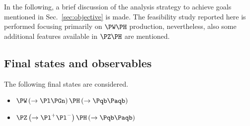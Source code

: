 \documentclass[a4paper,11pt]{article}
\newcommand{\Pb}{{{\Pqb}}\xspace}
\newcommand{\PAb}{{{{\Paqb}}}\xspace}
\begin{document}
In the following, a brief discussion of the analysis strategy to achieve goals mentioned in Sec.~\ref{sec:objective} is made. The feasibility study reported here is performed focusing primarily on $\PW\PH$ production, 
nevertheless, also some additional features available in $\PZ\PH$ are mentioned. 

\subsection{Final states and observables}

The following final states are considered.
\begin{itemize}
\item $\PW\left(\to \Pl \Pgn \right) \PH \left(\to \Pb \PAb \right)$
\item $\PZ\left(\to {\Pl}^{+} {\Pl}^{-} \right) \PH \left(\to \Pb \PAb \right)$
\end{itemize}
\end{document}
